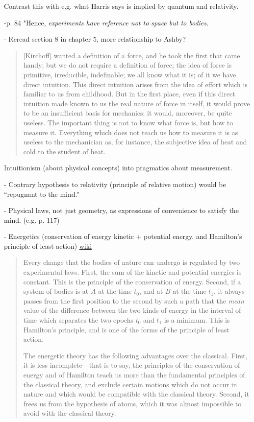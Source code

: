 Contrast this with e.g. what Harris says is implied by quantum and relativity.  

-p. 84 "Hence, \emph{experiments have reference not to space but to bodies.}

- Reread section 8 in chapter 5, more relationship to Ashby?

\begin{quote}
    [Kirchoff] wanted a definition of a force, and he took the first that came handy; but we do not require a definition of force; the idea of force is primitive, irreducible, indefinable; we all know what it is; of it we have direct intuition.  This direct intuition arises from the idea of effort which is familiar to us from childhood.  But in the first place, even if this direct intuition made known to us the real nature of force in itself, it would prove to be an insufficient basis for mechanics; it would, moreover, be quite useless.  The important thing is not to know what force is, but how to measure it.  Everything which does not teach us how to measure it is as useless to the mechanician as, for instance, the subjective idea of heat and cold to the student of heat.  
    \citep[p. 105-106]{Poincare1952}
\end{quote}

Intuitionism (about physical concepts) into pragmatics about measurement.

- Contrary hypothesis to relativity (principle of relative motion) would be ``repugnant to the mind.'' \citep[p. 111, 113]{Poincare1952}

- Physical laws, not just geometry, as expressions of convenience to satisfy the mind. (e.g. p. 117)


- Energetics (conservation of energy kinetic + potential energy, and Hamilton's principle of least action) \href{https://en.wikipedia.org/wiki/Hamilton%27s_principle}{wiki}

\begin{quote}
    Every change that the bodies of nature can undergo is regulated by two experimental laws.  First, the sum of the kinetic and potential energies is constant.  This is the principle of the conservation of energy.  Second, if a system of bodies is at $A$ at the time $t_0$, and at $B$ at the time $t_1$, it always passes from the first position to the second by such a path that the \emph{mean} value of the difference between the two kinds of energy in the interval of time which separates the two epochs $t_0$ and $t_1$ is a minimum.  This is Hamilton's principle, and is one of the forms of the principle of least action.  
    
    The energetic theory has the following advantages over the classical.  First, it is less incomplete---that is to say, the principles of the conservation of energy and of Hamilton teach us more than the fundamental principles of the classical theory, and exclude certain motions which do not occur in nature and which would be compatible with the classical theory.  Second, it frees us from the hypothesis of atoms, which it was almost impossible to avoid with the classical theory.  \citep[p. 123-124]{Poincare1952}
 \end{quote}
 
